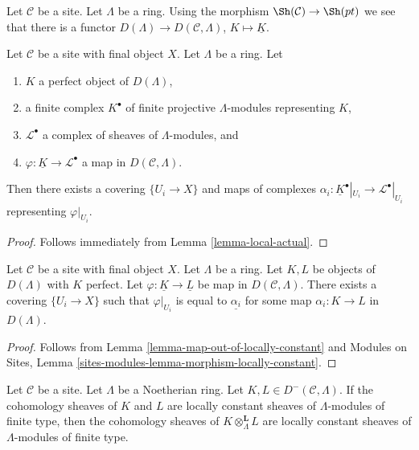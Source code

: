 \noindent
Let $\mathcal{C}$ be a site. Let $\Lambda$ be a ring. Using the
morphism $\Sh(\mathcal{C}) \to \Sh(pt)$ we see that there is a
functor $D(\Lambda) \to D(\mathcal{C}, \Lambda)$, $K \mapsto \underline{K}$.

\begin{lemma}
\label{lemma-map-out-of-locally-constant}
Let $\mathcal{C}$ be a site with final object $X$. Let $\Lambda$ be a ring. Let
\begin{enumerate}
\item $K$ a perfect object of $D(\Lambda)$,
\item a finite complex $K^\bullet$ of finite projective $\Lambda$-modules
representing $K$,
\item $\mathcal{L}^\bullet$ a complex of sheaves of $\Lambda$-modules, and
\item $\varphi : \underline{K} \to \mathcal{L}^\bullet$ a map in
$D(\mathcal{C}, \Lambda)$.
\end{enumerate}
Then there exists a covering $\{U_i \to X\}$ and maps of complexes
$\alpha_i : \underline{K}^\bullet|_{U_i} \to \mathcal{L}^\bullet|_{U_i}$
representing $\varphi|_{U_i}$.
\end{lemma}

\begin{proof}
Follows immediately from Lemma \ref{lemma-local-actual}.
\end{proof}

\begin{lemma}
\label{lemma-locally-constant-map}
Let $\mathcal{C}$ be a site with final object $X$.
Let $\Lambda$ be a ring. Let $K, L$ be objects of
$D(\Lambda)$ with $K$ perfect. Let $\varphi : \underline{K} \to \underline{L}$
be map in $D(\mathcal{C}, \Lambda)$. There exists a covering $\{U_i \to X\}$
such that $\varphi|_{U_i}$ is equal to $\underline{\alpha_i}$
for some map $\alpha_i : K \to L$ in $D(\Lambda)$.
\end{lemma}

\begin{proof}
Follows from Lemma \ref{lemma-map-out-of-locally-constant} and
Modules on Sites, Lemma \ref{sites-modules-lemma-morphism-locally-constant}.
\end{proof}

\begin{lemma}
\label{lemma-locally-constant-tensor-product}
Let $\mathcal{C}$ be a site. Let $\Lambda$ be a Noetherian ring.
Let $K, L \in D^-(\mathcal{C}, \Lambda)$. If the cohomology sheaves of
$K$ and $L$ are locally constant sheaves of $\Lambda$-modules of
finite type, then the cohomology sheaves of
$K \otimes_\Lambda^\mathbf{L} L$
are locally constant sheaves of $\Lambda$-modules of finite type.
\end{lemma}

